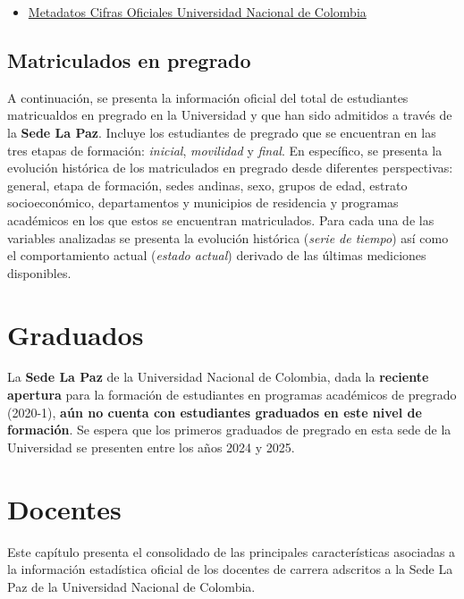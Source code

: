\documentclass[
]{book}
\providecommand{\tightlist}{%
  \setlength{\itemsep}{0pt}\setlength{\parskip}{0pt}}
\begin{document}
\begin{itemize}
\tightlist
\item
  \href{http://estadisticas.unal.edu.co/menu-principal/cifras-generales/metadatos/cifras-generales/}{Metadatos Cifras Oficiales Universidad Nacional de Colombia}
\end{itemize}

\hypertarget{MatPre}{%
\section{Matriculados en pregrado}\label{MatPre}}

A continuación, se presenta la información oficial del total de estudiantes matricualdos en pregrado en la Universidad y que han sido admitidos a través de la \textbf{Sede La Paz}. Incluye los estudiantes de pregrado que se encuentran en las tres etapas de formación: \emph{inicial}, \emph{movilidad} y \emph{final}. En específico, se presenta la evolución histórica de los matriculados en pregrado desde diferentes perspectivas: general, etapa de formación, sedes andinas, sexo, grupos de edad, estrato socioeconómico, departamentos y municipios de residencia y programas académicos en los que estos se encuentran matriculados. Para cada una de las variables analizadas se presenta la evolución histórica (\emph{serie de tiempo}) así como el comportamiento actual (\emph{estado actual}) derivado de las últimas mediciones disponibles.

\hypertarget{Grad}{%
\chapter{Graduados}\label{Grad}}

La \textbf{Sede La Paz} de la Universidad Nacional de Colombia, dada la \textbf{reciente apertura} para la formación de estudiantes en programas académicos de pregrado (2020-1), \textbf{aún no cuenta con estudiantes graduados en este nivel de formación}. Se espera que los primeros graduados de pregrado en esta sede de la Universidad se presenten entre los años 2024 y 2025.

\hypertarget{Doc}{%
\chapter{Docentes}\label{Doc}}

Este capítulo presenta el consolidado de las principales características asociadas a la información estadística oficial de los docentes de carrera adscritos a la Sede La Paz de la Universidad Nacional de Colombia.
\end{document}
